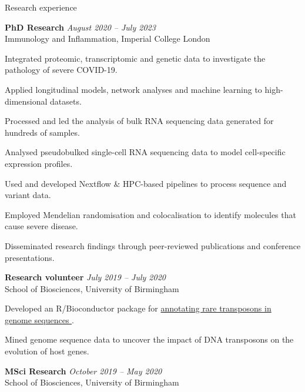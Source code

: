 \documentclass{resume}
\begin{document}
\begin{rSection}{Research experience}

\vspace{1pt plus 1pt}

\textbf{PhD Research} \hfill \textit{August 2020 -- July 2023} \\
Immunology and Inflammation, Imperial College London

\vspace{2pt plus 1pt minus 1pt}
\item Integrated proteomic, transcriptomic and genetic data to investigate the pathology of severe COVID-19.
\item Applied longitudinal models, network analyses and machine learning to high-dimensional datasets.
\item Processed and led the analysis of bulk RNA sequencing data generated for hundreds of samples. 
\item Analysed pseudobulked single-cell RNA sequencing data to model cell-specific expression profiles.
\item Used and developed Nextflow \& HPC-based pipelines to process sequence and variant data.
\item Employed Mendelian randomisation and colocalisation to identify molecules that cause severe disease.
\item Disseminated research findings through peer-reviewed publications and conference presentations. 

\textbf{Research volunteer} \hfill \textit{July 2019 -- July 2020} \\
School of Biosciences, University of Birmingham

\vspace{2pt plus 1pt minus 1pt}
\item Developed an R/Bioconductor package for \href{https://bioconductor.org/packages/release/bioc/html/packFinder.html}{annotating rare transposons in genome sequences \faGithub}.
\item Mined genome sequence data to uncover the impact of DNA transposons on the evolution of host genes.

\textbf{MSci Research} \hfill \textit{October 2019 -- May 2020} \\
School of Biosciences, University of Birmingham


\end{rSection}
\end{document}
